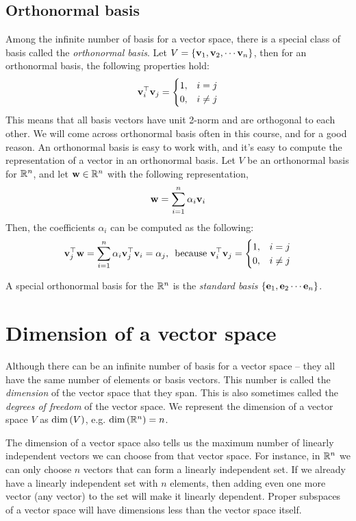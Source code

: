 \subsection{Orthonormal basis}
Among the infinite number of basis for a vector space, there is a special class of basis called the \textit{orthonormal basis}. Let $V = \left\{ \mathbf{v}_1, \mathbf{v}_2, \cdots \mathbf{v}_n\right\}$, then for an orthonormal basis, the following properties hold:
\begin{equation}
    \mathbf{v}_i^\top\mathbf{v}_j = \begin{cases} 1, & i = j \\ 0, & i \neq j \end{cases}
\end{equation}
This means that all basis vectors have unit 2-norm and are orthogonal to each other. We will come across orthonormal basis often in this course, and for a good reason. An orthonormal basis is easy to work with, and it's easy to compute the representation of a vector in an orthonormal basis. Let $V$ be an orthonormal basis for $\mathbb{R}^n$, and let $\mathbf{w} \in \mathbb{R}^n$ with the following representation,
\[ \mathbf{w} = \sum_{i=1}^n \alpha_i \mathbf{v}_i \]
Then, the coefficients $\alpha_i$ can be computed as the following:
\[ \mathbf{v}_j^\top\mathbf{w} =  \sum_{i=1}^n \alpha_i \mathbf{v}_j^\top\mathbf{v}_i = \alpha_j, \,\,\, \text{because } \mathbf{v}_i^\top\mathbf{v}_j = \begin{cases} 1, & i = j \\ 0, & i \neq j \end{cases} \]

A special orthonormal basis for the $\mathbb{R}^n$ is the \textit{standard basis} $\left\{ \mathbf{e}_1, \mathbf{e}_2 \cdots \mathbf{e}_n\right\}$.

\section{Dimension of a vector space}
Although there can be an infinite number of basis for a vector space -- they all have the same number of elements or basis vectors. This number is called the \textit{dimension} of the vector space that they span. This is also sometimes called the 
\textit{degrees of freedom} of the vector space. We represent the dimension of a vector space $V$ as $\text{dim}\left( V\right)$, e.g. $\text{dim}\left( \mathbb{R}^n\right) = n$.

The dimension of a vector space also tells us the maximum number of linearly independent vectors we can choose from that vector space. For instance, in $\mathbb{R}^n$ we can only choose $n$ vectors that can form a linearly independent set. If we already have a linearly independent set with $n$ elements, then adding even one more vector (any vector) to the set will make it linearly dependent. Proper subspaces of a vector space will have dimensions less than the vector space itself.

